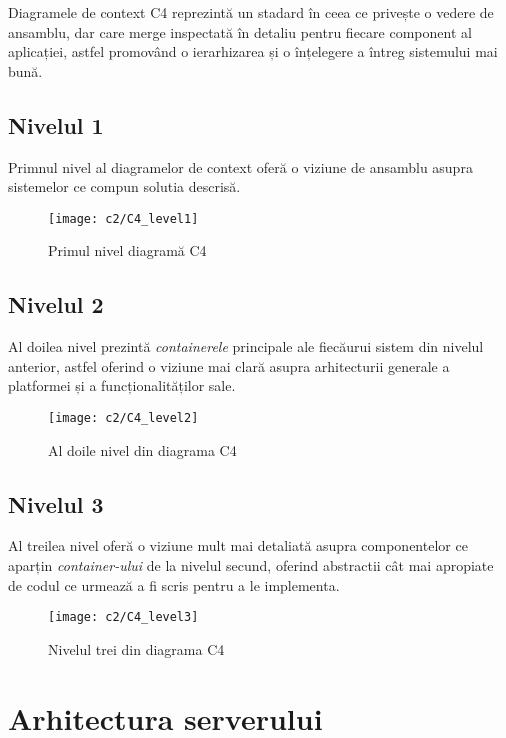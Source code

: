 Diagramele de context C4 reprezintă un stadard în ceea ce privește o vedere de ansamblu, dar care merge inspectată în detaliu pentru fiecare component al aplicației, astfel promovând o ierarhizarea și o înțelegere a întreg sistemului mai bună.\\


\subsection*{Nivelul 1}
Primnul nivel al diagramelor de context oferă o viziune de ansamblu asupra sistemelor ce compun solutia descrisă.
\vspace{1cm}
\begin{figure}[h]
	\centering
	
	\texttt{[image: c2/C4\_level1]}
	\caption{Primul nivel diagramă C4}
\end{figure}

\newpage
\subsection*{Nivelul 2}
Al doilea nivel prezintă  \textit{containerele} principale ale fiecăurui sistem din nivelul anterior, astfel oferind o viziune mai clară asupra arhitecturii generale a platformei și a funcționalităților sale.
\vspace{1cm}
\begin{figure}[h]
	\centering
	
	\texttt{[image: c2/C4\_level2]}
	\caption{Al doile nivel din diagrama C4}
\end{figure}

\subsection*{Nivelul 3}
Al treilea nivel oferă o viziune mult mai detaliată asupra componentelor ce aparțin \textit{container-ului} de la nivelul secund, oferind abstractii cât mai apropiate de codul ce urmează a fi scris pentru a le implementa.

\vspace{1cm}
\begin{figure}[h]
	\centering
	
	\texttt{[image: c2/C4\_level3]}
	\caption{Nivelul trei din diagrama C4}
\end{figure}



\section{Arhitectura serverului}

